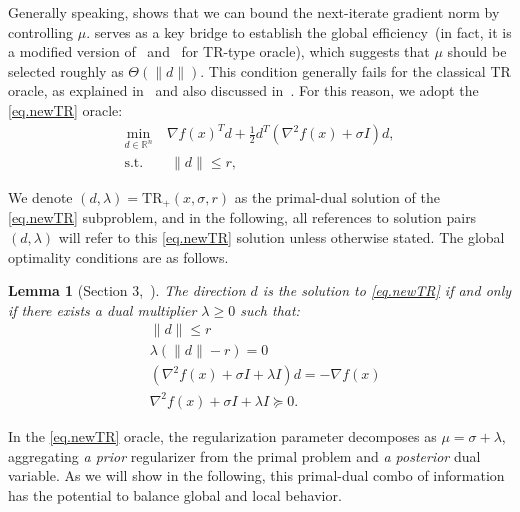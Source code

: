 \documentclass{article}
\newtheorem{lemma}[theorem]{Lemma}
\numberwithin{equation}{section}
\newcommand{\trp}{\textrm{TR}_+}
\numberwithin{equation}{section}
\begin{document}
Generally speaking,  shows that we can bound the next-iterate gradient norm by controlling $\mu$.
    { serves as a key bridge to establish the global efficiency~(in fact, it is a modified version of~\cite[Lemma 4.2.5]{nesterov2018lectures} and~\cite[Corollary 1]{nesterov2021implementable} for TR-type oracle)}, which suggests that $\mu$ should be selected roughly as $\Theta(\|d\|)$. This condition generally fails for the classical TR oracle, as explained in~ and also discussed in~\cite{curtis2018concise,curtis2017trust}. For this reason, we adopt the \ref{eq.newTR} oracle:
\begin{equation}\label{eq.newTR}
    \tag{TR$_+$}
    \begin{aligned}
        \min_{d \in \mathbb{R}^n}~ & \nabla f(x)^T d
        + \tfrac{1}{2} d^T (\nabla^2 f(x) + \sigma I) d, \\
        \text{s.t.}                & ~ \|d\| \le r,
    \end{aligned}
\end{equation}

We denote $(d, \lambda) = \trp(x, \sigma, r)$ as the primal-dual solution of the \ref{eq.newTR} subproblem, and in the following, all references to solution pairs $(d,\lambda)$ will refer to this \ref{eq.newTR} solution unless otherwise stated.
The global optimality conditions are as follows.
\begin{lemma}[Section 3,~\citet{conn2000trust}]\label{lem.optimal condition}
    The direction $d$ is the solution to \ref{eq.newTR} if and only if there exists a dual multiplier $\lambda \geq 0$ such that: \begin{subequations}\label{eq.sa}
        \begin{align}
            \label{eq.optcond primal}
             & \| d\| \leq r                                            \\
            \label{eq.optcond coml slack}
             & \lambda \left(\|d\|-r \right)=0                          \\ \label{eq.optcond firstorder}
             & (\nabla^2 f(x) + \sigma I + \lambda I ) d = -\nabla f(x) \\
            \label{eq.optcond secondorder}
             & \nabla^2 f(x) + \sigma I + \lambda I \succeq 0.
        \end{align}
    \end{subequations}
\end{lemma}
In the \ref{eq.newTR} oracle, the regularization parameter decomposes as $\mu=\sigma+\lambda$, aggregating \emph{a prior} regularizer from the primal problem and \emph{a posterior} dual variable. As we will show in the following, this primal-dual combo of information has the potential to balance global and local behavior.
\end{document}

